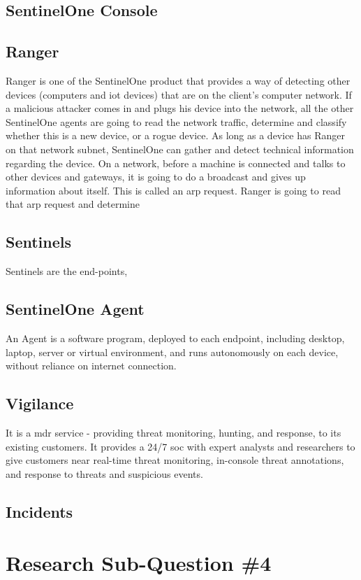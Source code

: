 \begin{multicols}{2}
      \subsection{SentinelOne Console}
      \subsection{Ranger}
      Ranger is one of the SentinelOne product that provides a way of detecting other devices (computers and
      \acrshort{iot} devices) that are on the client's computer network. If a malicious attacker comes in and plugs his device
      into the network, all the other SentinelOne agents are going to read the network traffic, determine and classify whether
      this is a new device, or a rogue device. As long as a device has Ranger on that network subnet, SentinelOne can gather and
      detect technical information regarding the device. On a network, before a machine is connected and talks to other devices
      and gateways, it is going to do a broadcast and gives up information about itself. This is called an \acrshort{arp} request.
      Ranger is going to read that \acrshort{arp} request and determine

      \subsection{Sentinels}
      Sentinels are the end-points,
      \subsection{SentinelOne Agent}
      An Agent is a software program, deployed to each endpoint, including desktop, laptop, server or virtual environment,
      and runs autonomously on each device, without reliance on internet connection.
      \subsection{Vigilance}
      It is a \acrshort{mdr} service - providing threat monitoring, hunting, and response, to its existing customers. It
      provides a 24/7 \acrshort{soc} with expert analysts and researchers to give customers near real-time threat monitoring,
      in-console threat annotations, and response to threats and suspicious events.
      \subsection{Incidents}

      \section{Research Sub-Question \#4}
\end{multicols}